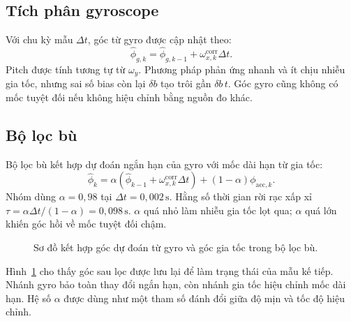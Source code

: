 \documentclass[14pt,a4paper,oneside]{extreport}
\newcommand{\unit}[1]{\,\mathrm{#1}}
\begin{document}
\subsection{Tích phân gyroscope}
Với chu kỳ mẫu $\Delta t$, góc từ gyro được cập nhật theo:
\begin{equation}\label{eq:gyro_int}
\hat\phi_{g,k}=\hat\phi_{g,k-1}+\omega_{x,k}^{\mathrm{corr}}\Delta t.
\end{equation}
Pitch được tính tương tự từ $\omega_y$. Phương pháp phản ứng nhanh và ít chịu nhiễu gia tốc, nhưng sai số bias còn lại $\delta b$ tạo trôi gần $\delta b\,t$. Góc gyro cũng không có mốc tuyệt đối nếu không hiệu chỉnh bằng nguồn đo khác.

\subsection{Bộ lọc bù}
Bộ lọc bù kết hợp dự đoán ngắn hạn của gyro với mốc dài hạn từ gia tốc:
\begin{equation}\label{eq:cf}
\hat\phi_k=\alpha\left(\hat\phi_{k-1}+\omega_{x,k}^{\mathrm{corr}}\Delta t\right)
 +(1-\alpha)\phi_{\mathrm{acc},k}.
\end{equation}
Nhóm dùng $\alpha=0{,}98$ tại $\Delta t=0{,}002\unit{s}$. Hằng số thời gian rời rạc xấp xỉ $\tau=\alpha\Delta t/(1-\alpha)=0{,}098\unit{s}$. $\alpha$ quá nhỏ làm nhiễu gia tốc lọt qua; $\alpha$ quá lớn khiến góc hồi về mốc tuyệt đối chậm.

\begin{figure}[htbp]\centering
\resizebox{\textwidth}{!}{}
\caption{Sơ đồ kết hợp góc dự đoán từ gyro và góc gia tốc trong bộ lọc bù.}\label{fig:cf}
\end{figure}
Hình~\ref{fig:cf} cho thấy góc sau lọc được lưu lại để làm trạng thái của mẫu kế tiếp. Nhánh gyro bảo toàn thay đổi ngắn hạn, còn nhánh gia tốc hiệu chỉnh mốc dài hạn. Hệ số $\alpha$ được dùng như một tham số đánh đổi giữa độ mịn và tốc độ hiệu chỉnh.
\end{document}
